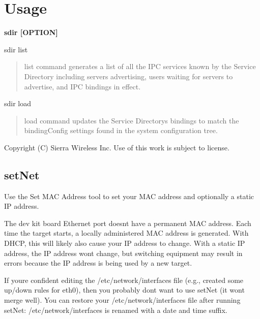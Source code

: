 \section*{Usage}

{\bfseries {\ttfamily  sdir \mbox{[}O\+P\+T\+I\+O\+N\mbox{]}}}

\begin{DoxyVerb}sdir list \end{DoxyVerb}


\begin{quote}
{\ttfamily list} command generates a list of all the I\+P\+C services known by the Service Directory including servers advertising, users waiting for servers to advertise, and I\+P\+C bindings in effect. \end{quote}


\begin{DoxyVerb}sdir load \end{DoxyVerb}


\begin{quote}
{\ttfamily load} command updates the Service Directory\textquotesingle{}s bindings to match the binding\+Config settings found in the {\ttfamily system} configuration tree. \end{quote}






Copyright (C) Sierra Wireless Inc. Use of this work is subject to license. \hypertarget{toolsTarget_setNet}{}\subsection{set\+Net}\label{toolsTarget_setNet}
Use the Set M\+A\+C Address tool to set your M\+A\+C address and optionally a static I\+P address.

The dev kit board Ethernet port doesn\textquotesingle{}t have a permanent M\+A\+C address. Each time the target starts, a locally administered M\+A\+C address is generated. With D\+H\+C\+P, this will likely also cause your I\+P address to change. With a static I\+P address, the I\+P address won\textquotesingle{}t change, but switching equipment may result in errors because the I\+P address is being used by a new target.

If you\textquotesingle{}re confident editing the {\ttfamily /etc/network/interfaces} file (e.\+g., created some up/down rules for {\ttfamily eth0}), then you probably don\textquotesingle{}t want to use {\ttfamily set\+Net} (it won\textquotesingle{}t merge well). You can restore your {\ttfamily /etc/network/interfaces} file after running {\ttfamily set\+Net\+:} {\ttfamily /etc/network/interfaces} is renamed with a date and time suffix.

